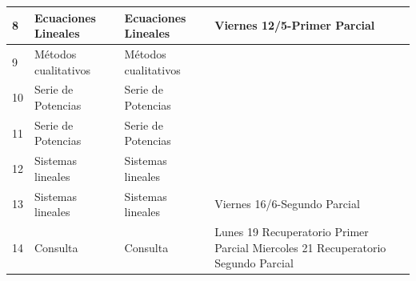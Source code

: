 \documentclass[12pt]{article}
\begin{document}
\begin{enumerate}
\begin{table}[h]
\begin{tabular}{|m{0.6cm} |m{5cm}|m{5cm}|m{4.8cm}|}
  8& Ecuaciones Lineales   &  Ecuaciones Lineales &  Viernes 12/5-Primer Parcial  \\ \hline

  9 & Métodos cualitativos & Métodos cualitativos   &   \\ \hline
  10 & Serie de Potencias  & Serie de Potencias  &   \\ \hline
  11 & Serie de Potencias   & Serie de Potencias  &   \\ \hline
  12 & Sistemas lineales  & Sistemas lineales  &   \\ \hline
  13 & Sistemas lineales & Sistemas lineales  &  Viernes 16/6-Segundo Parcial \\ \hline
  14  & Consulta & Consulta &  Lunes 19 Recuperatorio Primer Parcial\newline
  Miercoles 21 Recuperatorio Segundo Parcial \\ \hline

\end{tabular}
\end{table}

\end{enumerate}
















%
%
  
  
\end{document}
